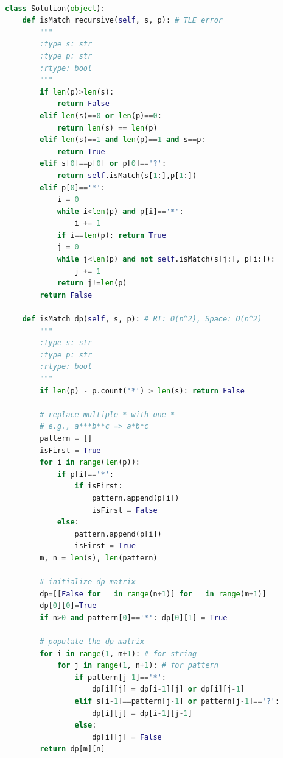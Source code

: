 \documentclass[a4paper,10pt]{article}
\begin{document}
\begin{lstlisting}[language=Python, caption=Problem44. Wildcard Matching]

class Solution(object):
    def isMatch_recursive(self, s, p): # TLE error
        """
        :type s: str
        :type p: str
        :rtype: bool
        """
        if len(p)>len(s):
            return False
        elif len(s)==0 or len(p)==0:
            return len(s) == len(p)
        elif len(s)==1 and len(p)==1 and s==p:
            return True
        elif s[0]==p[0] or p[0]=='?':
            return self.isMatch(s[1:],p[1:])
        elif p[0]=='*':
            i = 0
            while i<len(p) and p[i]=='*':
                i += 1
            if i==len(p): return True
            j = 0
            while j<len(p) and not self.isMatch(s[j:], p[i:]):
                j += 1
            return j!=len(p)
        return False
        
    def isMatch_dp(self, s, p): # RT: O(n^2), Space: O(n^2)
        """
        :type s: str
        :type p: str
        :rtype: bool
        """
        if len(p) - p.count('*') > len(s): return False
        
        # replace multiple * with one *
        # e.g., a***b**c => a*b*c
        pattern = []
        isFirst = True
        for i in range(len(p)):
            if p[i]=='*':
                if isFirst:
                    pattern.append(p[i])
                    isFirst = False
            else:
                pattern.append(p[i])
                isFirst = True
        m, n = len(s), len(pattern)
        
        # initialize dp matrix
        dp=[[False for _ in range(n+1)] for _ in range(m+1)]
        dp[0][0]=True
        if n>0 and pattern[0]=='*': dp[0][1] = True
        
        # populate the dp matrix
        for i in range(1, m+1): # for string
            for j in range(1, n+1): # for pattern
                if pattern[j-1]=='*':
                    dp[i][j] = dp[i-1][j] or dp[i][j-1]
                elif s[i-1]==pattern[j-1] or pattern[j-1]=='?':
                    dp[i][j] = dp[i-1][j-1]
                else:
                    dp[i][j] = False
        return dp[m][n]


\end{lstlisting}
\end{document}

